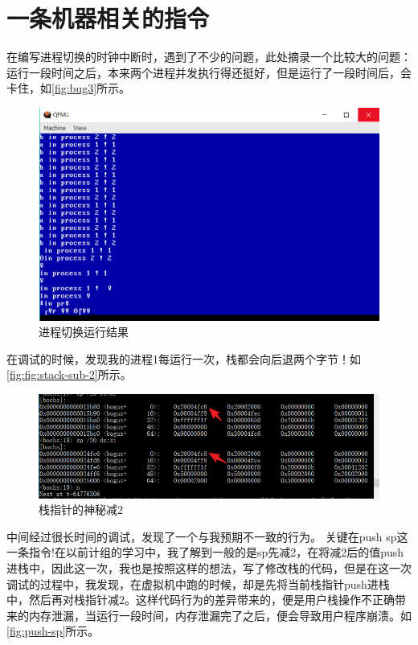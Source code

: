 \documentclass[forprint]{WHUBachelor}
\begin{document}
\section{一条机器相关的指令}

在编写进程切换的时钟中断时，遇到了不少的问题，此处摘录一个比较大的问题：
运行一段时间之后，本来两个进程并发执行得还挺好，但是运行了一段时间后，会卡住，如\autoref{fig:bug3}所示。

\begin{figure}[htp]
  \centering
  \includegraphics[width=13cm]{"./figure/2018-04-17-10-42-45.png"}
  \caption{进程切换运行结果}
  \label{fig:bug3}
\end{figure}

在调试的时候，发现我的进程1每运行一次，栈都会向后退两个字节！如\autoref{fig:fig:stack-sub-2}所示。

\begin{figure}[htp]
  \centering
  \includegraphics[width=13cm]{"./figure/2018-04-17-10-44-26.png"}
  \caption{栈指针的神秘减2}
  \label{fig:stack-sub-2}
\end{figure}

中间经过很长时间的调试，发现了一个与我预期不一致的行为。
关键在push sp这一条指令!在以前计组的学习中，我了解到一般的是sp先减2，在将减2后的值push进栈中，因此这一次，我也是按照这样的想法，写了修改栈的代码，但是在这一次调试的过程中，我发现，在虚拟机中跑的时候，却是先将当前栈指针push进栈中，然后再对栈指针减2。这样代码行为的差异带来的，便是用户栈操作不正确带来的内存泄漏，当运行一段时间，内存泄漏完了之后，便会导致用户程序崩溃。如\autoref{fig:push-sp}所示。
\end{document}
